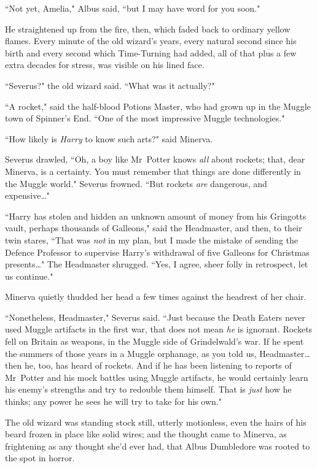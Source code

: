 ``Not yet, Amelia," Albus said, ``but I may have word for you soon."

He straightened up from the fire, then, which faded back to ordinary yellow flames. Every minute of the old wizard's years, every natural second since his birth and every second which Time-Turning had added, all of that plus a few extra decades for stress, was visible on his lined face.

``Severus?" the old wizard said. ``What was it actually?"

``A rocket," said the half-blood Potions Master, who had grown up in the Muggle town of Spinner's End. ``One of the most impressive Muggle technologies."

``How likely is \emph{Harry} to know such arts?" said Minerva.

Severus drawled, ``Oh, a boy like Mr~Potter knows \emph{all} about rockets; that, dear Minerva, is a certainty. You must remember that things are done differently in the Muggle world." Severus frowned. ``But rockets \emph{are} dangerous, and expensive…"

``Harry has stolen and hidden an unknown amount of money from his Gringotts vault, perhaps thousands of Galleons," said the Headmaster, and then, to their twin stares, ``That was \emph{not} in my plan, but I made the mistake of sending the Defence Professor to supervise Harry's withdrawal of five Galleons for Christmas presents…" The Headmaster shrugged. ``Yes, I agree, sheer folly in retrospect, let us continue."

Minerva quietly thudded her head a few times against the headrest of her chair.

``Nonetheless, Headmaster," Severus said. ``Just because the Death Eaters never used Muggle artifacts in the first war, that does not mean \emph{he} is ignorant. Rockets fell on Britain as weapons, in the Muggle side of Grindelwald's war. If he spent the summers of those years in a Muggle orphanage, as you told us, Headmaster…then he, too, has heard of rockets. And if he has been listening to reports of Mr~Potter and his mock battles using Muggle artifacts, he would certainly learn his enemy's strengths and try to redouble them himself. That is \emph{just} how he thinks; any power he sees he will try to take for his own."

The old wizard was standing stock still, utterly motionless, even the hairs of his beard frozen in place like solid wires; and the thought came to Minerva, as frightening as any thought she'd ever had, that Albus Dumbledore was rooted to the spot in horror.

